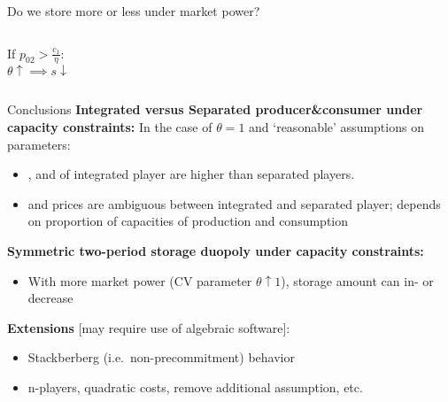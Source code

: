 \documentclass[aspectratio=169,t]{beamer}  %
\begin{document}
\begin{frame}{Do we store more or less under market power?}
\begin{columns}
If $p_{02}>\frac{c_1}{\eta}$:\\[1ex]
\qquad $\theta\uparrow \implies s\downarrow$
\end{columns}

\end{frame}

\begin{frame}{Conclusions}
\textbf{Integrated versus Separated producer\&consumer under capacity constraints:} In the case of $\theta=1$ and `reasonable' assumptions on parameters: 
\begin{itemize}
 \item {}, and  of integrated player are higher than separated players.
  \item {} and prices are ambiguous between integrated and separated player; depends on proportion of capacities of production and consumption
\end{itemize}
\textbf{Symmetric two-period storage duopoly under capacity constraints:}
\begin{itemize}
    \item With more market power (CV parameter $\theta\uparrow1$), storage amount can in- or decrease 
\end{itemize}
\bigskip
\textbf{Extensions} [may require use of algebraic software]:
\begin{itemize}
    \item Stackberberg (i.e.\ non-precommitment) behavior
    \item n-players, quadratic costs, remove additional assumption, etc.
\end{itemize}

\end{frame}

\begin{frame}{}
\end{frame}
\end{document}
